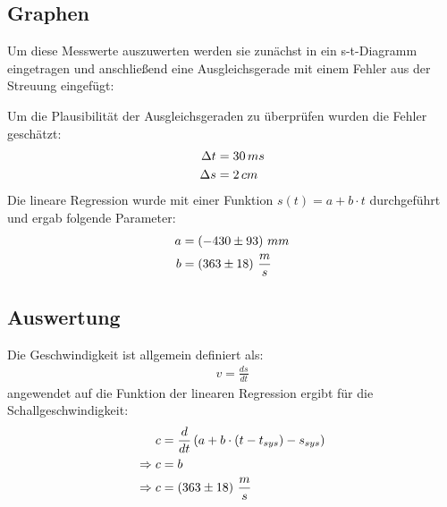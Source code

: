 \subsection{Graphen}
Um diese Messwerte auszuwerten werden sie zunächst in ein s-t-Diagramm eingetragen und anschließend eine Ausgleichsgerade mit einem Fehler aus der Streuung eingefügt:
\begin{center}
\begin{minipage}{\linewidth}
\centering
{}
\end{minipage}
\label{bsp}
\end{center}
Um die Plausibilität der Ausgleichsgeraden zu überprüfen wurden die Fehler geschätzt:
\begin{align}
\Delta t & = 30\, ms \notag \\ 
\Delta s & = 2\, cm \notag
\end{align}
Die lineare Regression wurde mit einer Funktion \(s(t) = a + b \cdot t\) durchgeführt und ergab folgende Parameter:
\begin{align}
a &= \left(-430 \pm 93 \right)\, mm \notag \\
b &= \left( 363 \pm 18 \right)\, \frac{m}{s} \notag
\end{align}
\subsection{Auswertung}
Die Geschwindigkeit ist allgemein definiert als:
\begin{align}
v = \frac{ds}{dt}
\end{align}
angewendet auf die Funktion der linearen Regression ergibt für die Schallgeschwindigkeit:
\begin{align}
c &= \frac{d}{dt} \left(a + b \cdot \left(t - t_{sys} \right) - s_{sys} \right)  \label{drv}\\
\Rightarrow c &= b \\
\Rightarrow c &=  \left( 363 \pm 18 \right)\, \frac{m}{s} \notag
\end{align}
